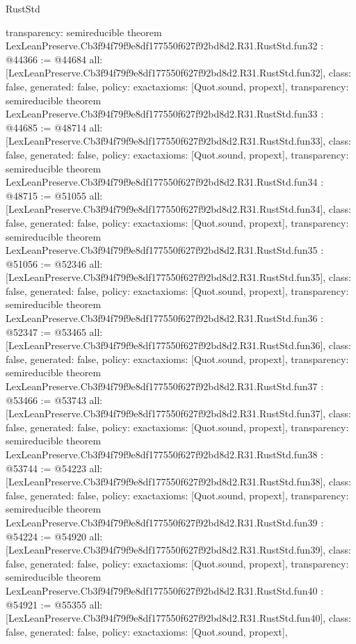 \begin{lexlean}{RustStd}
\begin{coremodule}
{  transparency: semireducible
}
theorem LexLeanPreserve.Cb3f94f79f9e8df177550f627f92bd8d2.R31.RustStd.fun32 : @44366 := @44684 {
  all: [LexLeanPreserve.Cb3f94f79f9e8df177550f627f92bd8d2.R31.RustStd.fun32],
  class: false,
  generated: false,
  policy: exact{axioms: [Quot.sound, propext]},
  transparency: semireducible
}
theorem LexLeanPreserve.Cb3f94f79f9e8df177550f627f92bd8d2.R31.RustStd.fun33 : @44685 := @48714 {
  all: [LexLeanPreserve.Cb3f94f79f9e8df177550f627f92bd8d2.R31.RustStd.fun33],
  class: false,
  generated: false,
  policy: exact{axioms: [Quot.sound, propext]},
  transparency: semireducible
}
theorem LexLeanPreserve.Cb3f94f79f9e8df177550f627f92bd8d2.R31.RustStd.fun34 : @48715 := @51055 {
  all: [LexLeanPreserve.Cb3f94f79f9e8df177550f627f92bd8d2.R31.RustStd.fun34],
  class: false,
  generated: false,
  policy: exact{axioms: [Quot.sound, propext]},
  transparency: semireducible
}
theorem LexLeanPreserve.Cb3f94f79f9e8df177550f627f92bd8d2.R31.RustStd.fun35 : @51056 := @52346 {
  all: [LexLeanPreserve.Cb3f94f79f9e8df177550f627f92bd8d2.R31.RustStd.fun35],
  class: false,
  generated: false,
  policy: exact{axioms: [Quot.sound, propext]},
  transparency: semireducible
}
theorem LexLeanPreserve.Cb3f94f79f9e8df177550f627f92bd8d2.R31.RustStd.fun36 : @52347 := @53465 {
  all: [LexLeanPreserve.Cb3f94f79f9e8df177550f627f92bd8d2.R31.RustStd.fun36],
  class: false,
  generated: false,
  policy: exact{axioms: [Quot.sound, propext]},
  transparency: semireducible
}
theorem LexLeanPreserve.Cb3f94f79f9e8df177550f627f92bd8d2.R31.RustStd.fun37 : @53466 := @53743 {
  all: [LexLeanPreserve.Cb3f94f79f9e8df177550f627f92bd8d2.R31.RustStd.fun37],
  class: false,
  generated: false,
  policy: exact{axioms: [Quot.sound, propext]},
  transparency: semireducible
}
theorem LexLeanPreserve.Cb3f94f79f9e8df177550f627f92bd8d2.R31.RustStd.fun38 : @53744 := @54223 {
  all: [LexLeanPreserve.Cb3f94f79f9e8df177550f627f92bd8d2.R31.RustStd.fun38],
  class: false,
  generated: false,
  policy: exact{axioms: [Quot.sound, propext]},
  transparency: semireducible
}
theorem LexLeanPreserve.Cb3f94f79f9e8df177550f627f92bd8d2.R31.RustStd.fun39 : @54224 := @54920 {
  all: [LexLeanPreserve.Cb3f94f79f9e8df177550f627f92bd8d2.R31.RustStd.fun39],
  class: false,
  generated: false,
  policy: exact{axioms: [Quot.sound, propext]},
  transparency: semireducible
}
theorem LexLeanPreserve.Cb3f94f79f9e8df177550f627f92bd8d2.R31.RustStd.fun40 : @54921 := @55355 {
  all: [LexLeanPreserve.Cb3f94f79f9e8df177550f627f92bd8d2.R31.RustStd.fun40],
  class: false,
  generated: false,
  policy: exact{axioms: [Quot.sound, propext]},
}
\end{coremodule}
\end{lexlean}
